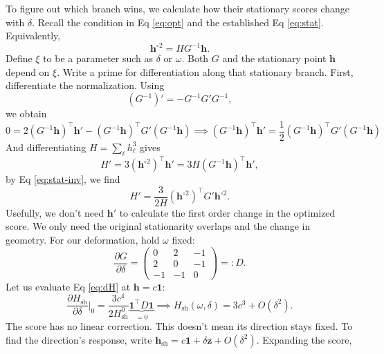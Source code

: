 \documentclass[11pt, reqno]{amsart}
\theoremstyle{notestyle}
\theoremstyle{defstyle}
\begin{document}
To figure out which branch wins, we calculate how their stationary scores change with $\delta$. Recall the condition in Eq \eqref{eq:opt} and the established Eq \eqref{eq:stat}. Equivalently, 
\begin{equation}
\label{eq:stat-inv}
    \mathbf h^{\circ 2} = HG^{-1} \mathbf h.
\end{equation}
Define $\xi$ to be a parameter such as $\delta$ or $\omega$. Both $G$ and the stationary point $\mathbf h$ depend on $\xi$. Write a prime for differentiation along that stationary branch. First, differentiate the normalization. Using
\begin{equation}
    (G^{-1})' = -G^{-1}G'G^{-1},
\end{equation}
we obtain
\begin{equation}
    0 = 2(G^{-1}\mathbf h)^\top \mathbf h' - (G^{-1}\mathbf h)^\top G'(G^{-1}\mathbf h) \implies (G^{-1}\mathbf h)^\top \mathbf h' = \frac 12 (G^{-1}\mathbf h)^\top G'(G^{-1}\mathbf h) 
\end{equation}
And differentiating $H = \sum_\ell h_\ell^3$ gives
\begin{equation}
    H' = 3(\mathbf h^{\circ 2})^\top \mathbf h' = 3H(G^{-1}\mathbf h)^\top \mathbf h',
\end{equation}
by Eq \eqref{eq:stat-inv}, we find
\begin{equation}
\label{eq:dH}
    H' = \frac{3}{2H}(\mathbf h^{\circ 2})^\top G' \mathbf h^{\circ 2}.
\end{equation}
Usefully, we don't need $\mathbf h'$ to calculate the first order change in the optimized score. We only need the original stationarity overlaps and the change in geometry. For our deformation, hold $\omega$ fixed:
\begin{equation}
    \frac{\partial G}{\partial \delta} = \begin{pmatrix}
        0 & 2 & -1 \\ 2 & 0 & -1 \\ -1 & -1 & 0
    \end{pmatrix} =: D.
\end{equation}
Let us evaluate Eq \eqref{eq:dH} at $\mathbf h = c\bm 1$:
\begin{equation}
\label{eq:Hsh}
    \frac{\partial H_{\text{sh}}}{\partial \delta}\Bigg|_0 = \frac{3c^4}{2H_{\text{sh}}^{0}}\underbrace{\bm1^\top D\bm 1}_{=0} \implies H_{\text{sh}}(\omega, \delta) = 3c^3 + O(\delta^2).
\end{equation}
The score has no linear correction. This doesn't mean its direction stays fixed. To find the direction's response, write $\mathbf h_{\text{sh}} = c\bm1 + \delta \mathbf z + O(\delta^2)$. Expanding the score, 
\end{document}
